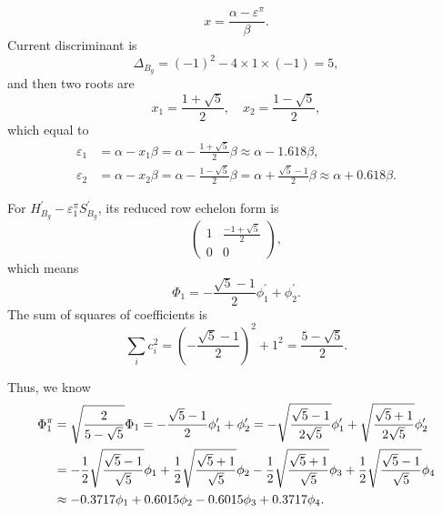 \documentclass[a4paper]{book}
\newcommand{\Hp}{H^\prime}
\newcommand{\Sp}{S^\prime}
\begin{document}
\begin{solution}
\begin{enumerate}[label=(\alph*)]
\begin{equation*}
			x = \frac{\alpha-\varepsilon^\pi}{\beta}.
		\end{equation*}
		Current discriminant is
		\begin{equation*}
			\Delta_{B_g} = (-1)^2 - 4 \times 1 \times (-1) = 5,
		\end{equation*}				
		and then two roots are
		\begin{equation*}
			x_1 = \frac{1+\sqrt{5}}{2}, \quad x_2 = \frac{1-\sqrt{5}}{2},
		\end{equation*}
		which equal to	
		\begin{align}
			\varepsilon_1 &= \alpha - x_1 \beta = \alpha - \frac{1+\sqrt{5}}{2} \beta \approx \alpha - 1.618 \beta , \\
			\varepsilon_2 &= \alpha - x_2 \beta = \alpha - \frac{1-\sqrt{5}}{2} \beta = \alpha + \frac{\sqrt{5}-1}{2} \beta \approx \alpha + 0.618 \beta .
		\end{align}
		
		For $\Hp_{B_g}-\varepsilon^\pi_1 \Sp_{B_g}$, its reduced row echelon form is
		\begin{equation*}
			\begin{pmatrix}
				1	& \frac{-1+\sqrt{5}}{2}	\\	0	&	0
			\end{pmatrix},
		\end{equation*}
		which means
		\begin{equation*}
			\Phi_1 = -\frac{\sqrt{5}-1}{2}\phi^\prime_1 + \phi^\prime_2.
		\end{equation*}
		The sum of squares of coefficients is
		\begin{equation*}
			\sum_{i} c^2_i = (-\frac{\sqrt{5}-1}{2})^2 + 1^2 = \frac{5-\sqrt{5}}{2}.
		\end{equation*}
		
		Thus, we know
		\begin{align}
			\Phi^\pi_1 &= \sqrt{ \frac{2}{5-\sqrt{5}} } \Phi_1 = -\frac{\sqrt{5}-1}{2}\phi^\prime_1 + \phi^\prime_2 = - \sqrt{\frac{\sqrt{5}-1}{2\sqrt{5}}} \phi^\prime_1 + \sqrt{\frac{\sqrt{5}+1}{2\sqrt{5}}} \phi^\prime_2	\notag \\
			&= - \frac{1}{2}\sqrt{\frac{\sqrt{5}-1}{\sqrt{5}}}\phi_1  + \frac{1}{2}\sqrt{\frac{\sqrt{5}+1}{\sqrt{5}}} \phi_2 - \frac{1}{2}\sqrt{\frac{\sqrt{5}+1}{\sqrt{5}}} \phi_3 + \frac{1}{2}\sqrt{\frac{\sqrt{5}-1}{\sqrt{5}}} \phi_4 \notag \\
			&\approx -0.3717 \phi_1 + 0.6015 \phi_2 - 0.6015 \phi_3 + 0.3717 \phi_4.
		\end{align}
		

\end{enumerate}
\end{solution}
\end{document}
